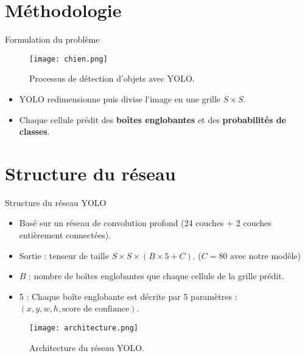 \documentclass{beamer}
\begin{document}
\section{Méthodologie}
\begin{frame}{Formulation du problème}

    \begin{figure}
        \centering
        \texttt{[image: chien.png]} 
        \caption{Processus de détection d'objets avec YOLO.}
    \end{figure}
    

    \begin{itemize}
        \item YOLO redimensionne puis divise l'image en une grille $S \times S$.\pause
        \item Chaque cellule prédit des \textbf{boîtes englobantes} et des \textbf{probabilités de classes}.
    \end{itemize}
    
\end{frame}









\section{Structure du réseau}
\begin{frame}{Structure du réseau YOLO}
    \begin{itemize}
        \item Basé sur un réseau de convolution profond (24 couches + 2 couches entièrement connectées).\pause
        \item Sortie : tenseur de taille \(S \times S \times (B \times 5 + C)\). (\(C = 80\) avec notre modèle)\pause
        \item \(B\) : nombre de boîtes englobantes que chaque cellule de la grille prédit.\pause
        \item 5 : Chaque boîte englobante est décrite par 5 paramètres : \((x, y, w, h, \text{score de confiance})\).\pause
    \end{itemize}
    \begin{figure}
        \centering
        \texttt{[image: architecture.png]}
        \caption{Architecture du réseau YOLO.}
    \end{figure}
\end{frame}
\end{document}

